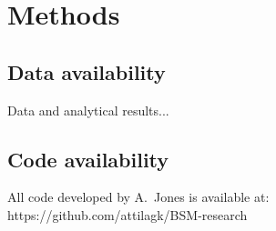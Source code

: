 \documentclass[letterpaper]{article}
\begin{document}
\section*{Methods}


\subsection*{Data availability}

Data and analytical results...

\subsection*{Code availability}

All code developed by A.~Jones is available at:\\
https://github.com/attilagk/BSM-research
\end{document}
